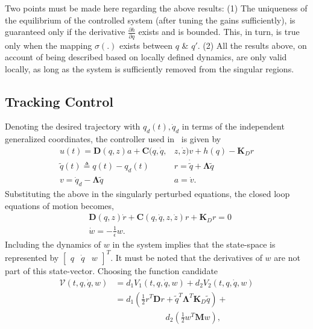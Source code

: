 \documentclass[10pt,final,journal,letterpaper,oneside,twocolumn]{IEEEtran}
\begin{document}
Two points must be made here regarding the above results: (1) The
uniqueness of the equilibrium of the controlled system (after tuning
the gains sufficiently), is guaranteed only if the derivative
$\frac{\partial h}{\partial q}$ exists and is bounded. This, in turn,
is true only when the mapping $\sigma(.)$ exists between $q$ \&
$q'$. (2) All the results above, on account of being described based
on locally defined dynamics, are only valid locally, as long as the
system is sufficiently removed from the singular regions.

\subsection{Tracking Control}
\label{sec:tracking-control}
Denoting the desired trajectory with $q_d(t), \dot{q}_d$ in terms of
the independent generalized coordinates, the controller used
in~\cite{wang_control_2006} is given by
\begin{align}
  u(t) = \bm{D}(q, z)a + \bm{C}(q, \dot{q}, &z, \dot{z})v + h(q) -
  \bm{K}_Dr\nonumber\\
  \tilde{q}(t) \triangleq q(t)-q_d(t)\quad &r=\dot{\tilde{q}} +
  \bm{\Lambda} \tilde{q}\nonumber\\
  v = \dot{q}_d-\bm{\Lambda}\tilde{q}\quad &a=\dot{v}.
  \label{eq:trackctrl}
\end{align}
Substituting the above in the singularly perturbed equations, the
closed loop equations of motion becomes,
\begin{align}
  &\bm{D}(q, z)\dot{r} + \bm{C}(q, \dot{q}, z, \dot{z})r + \bm{K}_Dr =
    0\nonumber\\
  &\dot{w} = -\frac{1}{\epsilon}w.\label{eq:trackclloop}
\end{align}
Including the dynamics of $w$ in the system implies that the
state-space is represented by ${\begin{bmatrix} q & \dot{q} &
    w \end{bmatrix}}^T$. It must be noted that the derivatives of $w$
are not part of this state-vector. Choosing the function candidate
\begin{align}
  \mathcal{V}(t, q, \dot{q}, w) &= d_1V_1(t, q, \dot{q}, w) + d_2V_2(t,
                                  q, \dot{q}, w)\nonumber\\
                                &= d_1\left( \frac{1}{2}r^T\bm{D}r +
                                  \tilde{q}^T \bm{\Lambda}^T \bm{K}_D
                                  \tilde{q} \right) +\nonumber\\
                                & \qquad\qquad\qquad
                                  d_2\left(\frac{1}{2}w^T\bm{M} w
                                  \right),
  \label{eq:lyapcand}
\end{align}
\end{document}
